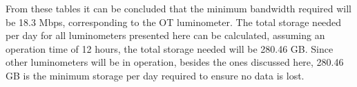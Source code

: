 From these tables it can be concluded that the minimum bandwidth required will be 18.3 Mbps, corresponding to the OT luminometer. The total storage needed per day for all luminometers presented here can be calculated, assuming an operation time of 12 hours, the total storage needed will be 280.46 GB. Since other luminometers will be in operation, besides the ones discussed here, 280.46 GB is the minimum storage per day required to ensure no data is lost.